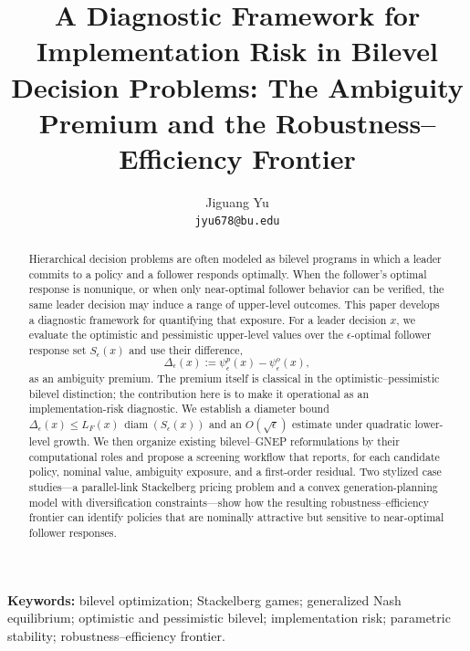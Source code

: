 \documentclass[11pt]{article}
\title{A Diagnostic Framework for Implementation Risk in Bilevel
Decision Problems: The Ambiguity Premium and the
Robustness--Efficiency Frontier}
\author{Jiguang Yu \\ \texttt{jyu678@bu.edu}}
\affil[1]{College of Engineering, Boston University, Boston, MA 02215, USA}
\theoremstyle{definition}
\newcommand{\eps}{\epsilon}
\DeclareMathOperator{\diam}{diam}
\begin{document}
\maketitle
  
\begin{abstract}
\noindent
Hierarchical decision problems are often modeled as bilevel programs
in which a leader commits to a policy and a follower responds
optimally. When the follower's optimal response is nonunique, or
when only near-optimal follower behavior can be verified, the same
leader decision may induce a range of upper-level outcomes. This
paper develops a diagnostic framework for quantifying that exposure.
For a leader decision $x$, we evaluate the optimistic and pessimistic
upper-level values over the $\eps$-optimal follower response set
$S_\eps(x)$ and use their difference,
\[
  \Delta_\eps(x):=\psi_\eps^p(x)-\psi_\eps^o(x),
\]
as an ambiguity premium. The premium itself is classical in the
optimistic--pessimistic bilevel distinction; the contribution here is
to make it operational as an implementation-risk diagnostic. We
establish a diameter bound
$\Delta_\eps(x)\le L_F(x)\,\diam(S_\eps(x))$ and an $O(\sqrt{\eps})$
estimate under quadratic lower-level growth. We then organize
existing bilevel--GNEP reformulations by their computational roles
and propose a screening workflow that reports, for each candidate
policy, nominal value, ambiguity exposure, and a first-order
residual. Two stylized case studies---a parallel-link Stackelberg
pricing problem and a convex generation-planning model with
diversification constraints---show how the resulting
robustness--efficiency frontier can identify policies that are
nominally attractive but sensitive to near-optimal follower
responses.
\end{abstract}

\noindent\textbf{Keywords:} bilevel optimization; Stackelberg
games; generalized Nash equilibrium; optimistic and pessimistic
bilevel; implementation risk; parametric stability;
robustness--efficiency frontier.
\end{document}
